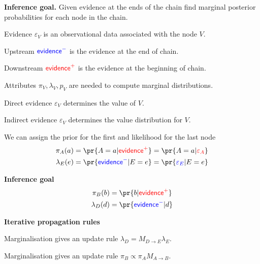 \documentclass[landscape,footrule]{foils}
\newcommand{\EVPOS}{\textcolor{red}{\mathsf{evidence}^+}}
\newcommand{\EVNEG}{\textcolor{blue}{\mathsf{evidence}^-}}
\begin{document}



\textbf{Inference goal.}
Given evidence at the ends of the chain find marginal posterior probabilities for each node in the chain.
\begin{triangles}
\item Evidence $\varepsilon_V$ is an observational data associated with the node $V$.
\item Upstream $\EVNEG$ is the evidence at the end of chain.
\item Downstream $\EVPOS$ is the evidence at the beginning of chain.
\item Attributes $\pi_V, \lambda_V, p_V$ are needed to compute marginal distributions. 
\end{triangles}



\vspace*{-0.5cm}

\begin{triangles}
\item Direct evidence $\varepsilon_V$ determines the value of $V$.
\item Indirect evidence $\varepsilon_V$ determines the value distribution for $V$. 
\item We can assign the prior for the first and likelihood for the last node
\begin{align*}
\pi_A(a)&=\pr{A=a|\EVPOS}=\pr{A=a|\textcolor{red}{\varepsilon_A}}\\
\lambda_E(e)&=\pr{\EVNEG|E=e}=\pr{\textcolor{blue}{\varepsilon_E}|E=e}
\end{align*}
\end{triangles}




\vspace*{-0.0cm}
\textbf{Inference goal}
\begin{align*}
\pi_B(b)&=\pr{b|\EVPOS}\\
\lambda_D(d)&=\pr{\EVNEG|d}
\end{align*}\vspace*{-1.5cm}


\textbf{Iterative propagation rules}
\begin{triangles}
\item Marginalisation gives an update rule $\lambda_D=M_{D\to E}\lambda_E$.
\item Marginalisation gives an update rule $\pi_B\propto \pi_A M_{A\to B}$.

\end{triangles}
\end{document}
